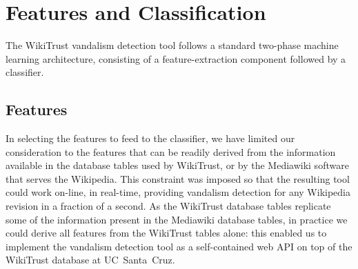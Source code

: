 \newcommand{\abs}{{{\textrm{abs}}}}
\newcommand{\sign}{{{\textrm{sign}}}}

\section{Features and Classification}

The WikiTrust vandalism detection tool follows a standard two-phase machine learning architecture, consisting of a feature-extraction component followed by a classifier. 

\subsection{Features}

In selecting the features to feed to the classifier, we have limited our consideration to the features that can be readily derived from the information available in the database tables used by WikiTrust, or by the Mediawiki software that serves the Wikipedia. 
This constraint was imposed so that the resulting tool could work on-line, in real-time, providing vandalism detection for any Wikipedia revision in a fraction of a second. 
As the WikiTrust database tables replicate some of the information present in the Mediawiki database tables, in practice we could derive all features from the WikiTrust tables alone: this enabled us to implement the vandalism detection tool as a self-contained web API on top of the WikiTrust database at UC~Santa~Cruz. 

